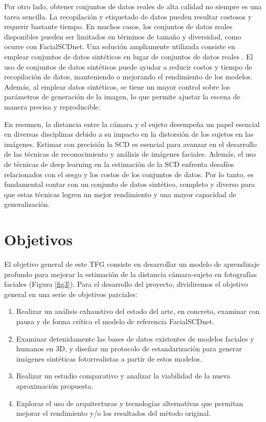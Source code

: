 Por otro lado, obtener conjuntos de datos reales de alta calidad no siempre es una tarea sencilla. La recopilación y etiquetado de datos pueden resultar costosos y requerir bastante tiempo. En muchos casos, los conjuntos de datos reales disponibles pueden ser limitados en términos de tamaño y diversidad, como ocurre con FacialSCDnet.
Una solución ampliamente utilizada consiste en emplear conjuntos de datos sintéticos en lugar de conjuntos de datos reales \cite{57,58,59}.
El uso de conjuntos de datos sintéticos puede ayudar a reducir costos y tiempo de recopilación de datos, manteniendo o mejorando el rendimiento de los modelos. Además, al emplear datos sintéticos, se tiene un mayor control sobre los parámetros de generación de la imagen, lo que permite ajustar la escena de manera precisa y reproducible.

En resumen, la distancia entre la cámara y el sujeto desempeña un papel esencial en diversas disciplinas debido a su impacto en la distorsión de los  sujetos en las imágenes. Estimar con precisión la SCD es esencial para avanzar en el desarrollo de las técnicas de reconocimiento y análisis de imágenes faciales. Además, el uso de técnicas de deep learning en la estimación de la SCD enfrenta desafíos relacionados con el sesgo y los costos de los conjuntos de datos. Por lo tanto, es fundamental contar con un conjunto de datos sintético, completo y diverso para que estas técnicas logren un mejor rendimiento y una mayor capacidad de generalización.

\section{Objetivos}
 El objetivo general de este TFG consiste en desarrollar un modelo de aprendizaje profundo para mejorar la estimación de la distancia cámara-sujeto en fotografías faciales (Figura \ref{fig3}). Para el desarrollo del proyecto, dividiremos el objetivo general en una serie de objetivos parciales:
\begin{enumerate}
    \item Realizar un análisis exhaustivo del estado del arte, en concreto, examinar con pausa y de forma crítica el modelo de referencia FacialSCDnet.
    \item Examinar detenidamente las bases de datos existentes de modelos faciales y humanos en 3D, y diseñar un protocolo de estandarización para generar imágenes sintéticas fotorrealistas a partir de estos modelos.
    \item Realizar un estudio comparativo y analizar la viabilidad de la nueva aproximación propuesta.
    \item Explorar el uso de arquitecturas y tecnologías alternativas que permitan mejorar el rendimiento y/o los resultados del método original.
\end{enumerate}


